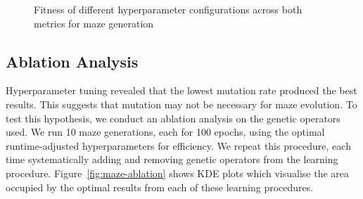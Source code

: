 \begin{figure}[!h]
\centering
            \hfill
            \hfill
            \caption{Fitness of different hyperparameter configurations across both metrics for maze generation}
\label{fig:maze-hyperparam}
\end{figure}


\subsection{Ablation Analysis}
Hyperparameter tuning revealed that the lowest mutation rate produced the best results. This suggests that mutation may not be necessary for maze evolution. To test this hypothesis, we conduct an ablation analysis on the genetic operators used. We run 10 maze generations, each for 100 epochs, using the optimal runtime-adjusted hyperparameters for efficiency. We repeat this procedure, each time systematically adding and removing genetic operators from the learning procedure. Figure~\ref{fig:maze-ablation} shows KDE plots which visualise the area occupied by the optimal results from each of these learning procedures.\\

